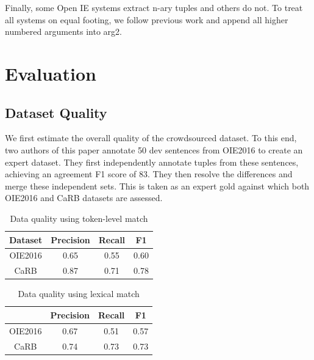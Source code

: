     Finally, some Open IE systems extract n-ary tuples and others do not. To treat all systems on equal footing, we follow previous work and append all higher numbered arguments into arg2. 

\section{Evaluation}
    \subsection{Dataset Quality}

        We first estimate the overall quality of the crowdsourced dataset. To this end, two authors of this paper annotate 50 dev sentences from OIE2016 to create an expert dataset. They first independently annotate tuples from these sentences, achieving an agreement F1 score of 83. They then resolve the differences and  merge these independent sets. This is taken as an expert gold against which both OIE2016 and CaRB datasets are assessed. 

        \begin{table}[h!]
        \centering
        \begin{tabular}{|c|c|c|c|}
        \hline
        Dataset       & Precision & Recall & F1    \\ \hline
        OIE2016 & 0.65     & 0.55  & 0.60 \\ %
        CaRB         & 0.87     & 0.71  & 0.78 \\ \hline
        \end{tabular}
        \vspace*{-1ex}
        \caption{Data quality using token-level match}
        \label{tab:token-level}
        \end{table}
        
        \begin{table}[h]
        \vspace*{-1ex}
        \centering
        \begin{tabular}{|c|c|c|c|}
        \hline
                & Precision & Recall & F1   \\ \hline
        OIE2016 & 0.67      & 0.51      & 0.57 \\ %
        CaRB   & 0.74      & 0.73      & 0.73 \\ \hline
        \end{tabular}
        \vspace*{-1ex}
        \caption{Data quality using lexical match}
        \label{tab:lexical}
        \vspace*{-1ex}
        \end{table}
        
